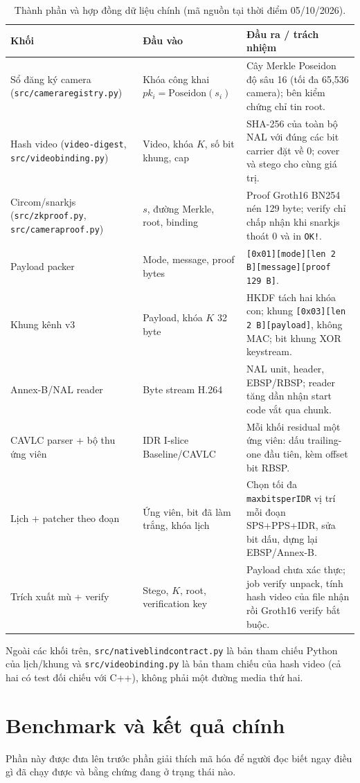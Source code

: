 \documentclass[11pt,a4paper]{article}
\renewcommand{\_}{\origunderscore\allowbreak}
\begin{document}
\begin{table}[H]\centering\small
\caption{Thành phần và hợp đồng dữ liệu chính (mã nguồn tại thời điểm 05/10/2026).}
\begin{tabularx}{\textwidth}{p{3.3cm}p{4.0cm}X}
\toprule Khối & Đầu vào & Đầu ra / trách nhiệm\\\midrule
Sổ đăng ký camera (\texttt{src/camera\_registry.py}) & Khóa công khai $pk_i=\mathrm{Poseidon}(s_i)$ & Cây Merkle Poseidon độ sâu 16 (tối đa 65,536 camera); bên kiểm chứng chỉ tin root.\\
Hash video (\texttt{video-digest}, \texttt{src/video\_binding.py}) & Video, khóa $K$, số bit khung, cap & SHA-256 của toàn bộ NAL với đúng các bit carrier đặt về 0; cover và stego cho cùng giá trị.\\
Circom/snarkjs (\texttt{src/zk\_proof.py}, \texttt{src/camera\_proof.py}) & $s$, đường Merkle, root, binding & Proof Groth16 BN254 nén 129 byte; verify chỉ chấp nhận khi snarkjs thoát 0 và in \texttt{OK!}.\\
Payload packer & Mode, message, proof bytes & \texttt{[0x01][mode][len 2 B][message][proof 129 B]}.\\
Khung kênh v3 & Payload, khóa $K$ 32 byte & HKDF tách hai khóa con; khung \texttt{[0x03][len 2 B][payload]}, không MAC; bit khung XOR keystream.\\
Annex-B/NAL reader & Byte stream H.264 & NAL unit, header, EBSP/RBSP; reader tăng dần nhận start code vắt qua chunk.\\
CAVLC parser + bộ thu ứng viên & IDR I-slice Baseline/CAVLC & Mỗi khối residual một ứng viên: dấu trailing-one đầu tiên, kèm offset bit RBSP.\\
Lịch + patcher theo đoạn & Ứng viên, bit đã làm trắng, khóa lịch & Chọn tối đa \texttt{max\_bits\_per\_IDR} vị trí mỗi đoạn SPS+PPS+IDR, sửa bit dấu, dựng lại EBSP/Annex-B.\\
Trích xuất mù + verify & Stego, $K$, root, verification key & Payload chưa xác thực; job verify unpack, tính hash video của file nhận rồi Groth16 verify bắt buộc.\\
\bottomrule
\end{tabularx}
\end{table}
Ngoài các khối trên, \texttt{src/native\_blind\_contract.py} là bản tham chiếu Python của lịch/khung và \texttt{src/video\_binding.py} là bản tham chiếu của hash video (cả hai có test đối chiếu với C++), không phải một đường media thứ hai.

\section{Benchmark và kết quả chính}\label{sec:bench}
Phần này được đưa lên trước phần giải thích mã hóa để người đọc biết ngay điều gì đã chạy được và bằng chứng đang ở trạng thái nào.
\end{document}
